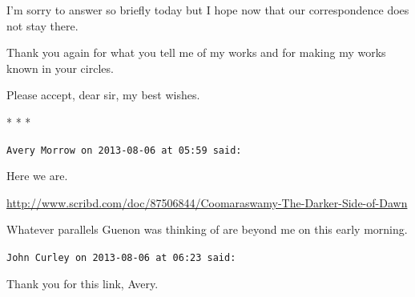 I'm sorry to answer so briefly today but I hope now that our correspondence does not stay there.

Thank you again for what you tell me of my works and for making my works known in your circles.

Please accept, dear sir, my best wishes.



\begin{center}* * *\end{center}

\begin{footnotesize}
\begin{sffamily}
\texttt{Avery Morrow on 2013-08-06 at 05:59 said:}

Here we are.

\url{http://www.scribd.com/doc/87506844/Coomaraswamy-The-Darker-Side-of-Dawn}


Whatever parallels Guenon was thinking of are beyond me on this early morning.

\hfill

\texttt{John Curley on 2013-08-06 at 06:23 said:}

Thank you for this link, Avery.


\hfill

\end{sffamily}
\end{footnotesize}

